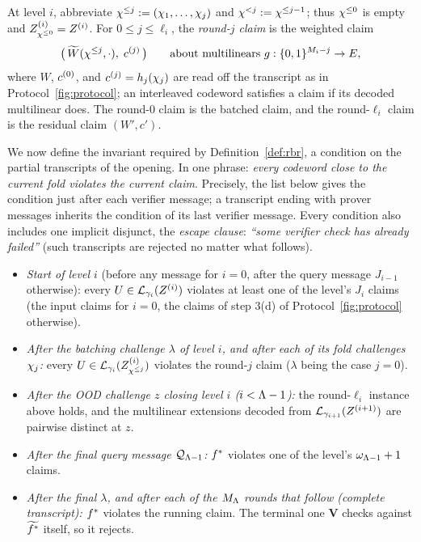 At level $i$, abbreviate $\chi^{\le j} := (\chi_1, \dots, \chi_j)$ and $\chi^{<j} := \chi^{\le j-1}$; thus $\chi^{\le 0}$ is empty and $Z^{(i)}_{\chi^{\le 0}} = Z^{(i)}$. For $0 \le j \le \ell_i$, the \emph{round-$j$ claim} is the weighted claim
\[
\bigl(\, \widetilde{W}(\chi^{\le j}, \cdot),\; c^{(j)} \,\bigr) \qquad \text{about multilinears } g : \{0,1\}^{M_i - j} \to E,
\]
where $W$, $c^{(0)}$, and $c^{(j)} = h_j(\chi_j)$ are read off the transcript as in Protocol~\ref{fig:protocol}; an interleaved codeword satisfies a claim if its decoded multilinear does. The round-$0$ claim is the batched claim, and the round-$\ell_i$ claim is the residual claim $(W', c')$.

We now define the invariant required by Definition~\ref{def:rbr}, a condition on the partial transcripts of the opening. In one phrase: \emph{every codeword close to the current fold violates the current claim}. Precisely, the list below gives the condition just after each verifier message; a transcript ending with prover messages inherits the condition of its last verifier message. Every condition also includes one implicit disjunct, the \emph{escape clause}: \emph{``some verifier check has already failed''} (such transcripts are rejected no matter what follows).
\begin{itemize}[itemsep=1pt]
\item \emph{Start of level $i$} (before any message for $i = 0$, after the query message $J_{i-1}$ otherwise): every $U \in \mathcal{L}_{\gamma_i}(Z^{(i)})$ violates at least one of the level's $J_i$ claims (the input claims for $i = 0$, the claims of step 3(d) of Protocol~\ref{fig:protocol} otherwise).
\item \emph{After the batching challenge $\lambda$ of level $i$, and after each of its fold challenges $\chi_j$:} every $U \in \mathcal{L}_{\gamma_i}(Z^{(i)}_{\chi^{\le j}})$ violates the round-$j$ claim ($\lambda$ being the case $j = 0$).
\item \emph{After the OOD challenge $z$ closing level $i$ ($i < \Lambda-1$):} the round-$\ell_i$ instance above holds, and the multilinear extensions decoded from $\mathcal{L}_{\gamma_{i+1}}(Z^{(i+1)})$ are pairwise distinct at $z$.
\item \emph{After the final query message $\mathcal{Q}_{\Lambda-1}$:} $f^{\ast}$ violates one of the level's $\omega_{\Lambda-1}+1$ claims.
\item \emph{After the final $\lambda$, and after each of the $M_\Lambda$ rounds that follow (complete transcript):} $f^{\ast}$ violates the running claim. The terminal one $\mathbf{V}$ checks against $\widetilde{f^{\ast}}$ itself, so it rejects.
\end{itemize}
